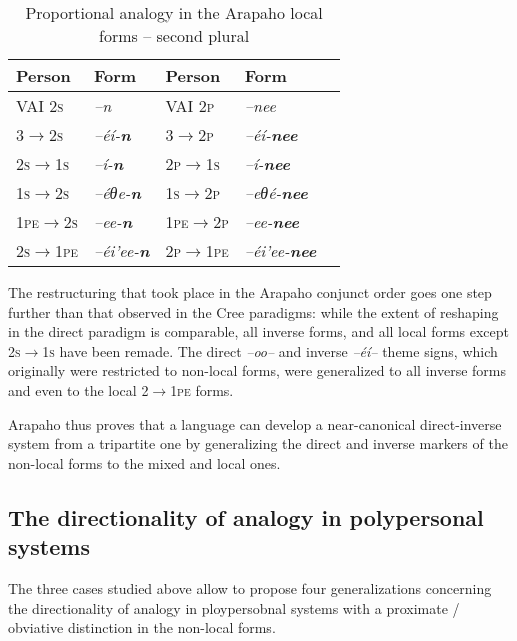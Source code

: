 \documentclass[twoside,a4paper,11pt]{article}
\newcommand{\ipa}[1]{{\phon\textit{#1}}}
\newcommand{\grise}[1]{\cellcolor{lightgray}\textbf{#1}}
\newcommand{\Σ}{\greek{Σ}}
\begin{document}
 
 \begin{table}[H]
\caption{Proportional analogy in the Arapaho local forms -- second plural}
\centering \label{tab:arapaho.analogy.local2}
\begin{tabular}{lllll}
\toprule
 Person &  Form &  Person &  Form\\
\midrule 
 VAI \textsc{2s} & \ipa{--n} &  VAI \textsc{2p} & \ipa{--nee} \\
  \textsc{3$\rightarrow$2s} & \ipa{--éí-\textbf{n}} &   \textsc{3$\rightarrow$2p} & \ipa{--éí-\textbf{nee}} \\
\textsc{2s$\rightarrow$1s}&  \ipa{--í-\textbf{n}} & \textsc{2p$\rightarrow$1s}&  \ipa{--í-\textbf{nee}} \\
   \midrule 
    \textsc{1s$\rightarrow$2s}& \ipa{--éθe-\textbf{n}} & \textsc{1s$\rightarrow$2p}&\ipa{--eθé-\textbf{nee}} \grise{} \\
    \textsc{1pe$\rightarrow$2s}&\ipa{--ee-\textbf{n}} & \textsc{1pe$\rightarrow$2p}&\ipa{--ee-\textbf{nee}}\grise{} \\
    \textsc{2s$\rightarrow$1pe}& \ipa{--éi'ee-\textbf{n}}&\textsc{2p$\rightarrow$1pe}&\ipa{--éi'ee-\textbf{nee}}\grise{}\\
\bottomrule
\end{tabular}
\end{table}
 
The restructuring that took place in the Arapaho conjunct order goes one step further than that observed in the Cree paradigms: while the extent of reshaping in the direct paradigm is comparable, all inverse forms, and   all local forms except \textsc{2s$\rightarrow$1s} have been remade. The direct \ipa{--oo--} and inverse \ipa{--éí--} theme signs, which originally were restricted to non-local forms, were generalized to all inverse forms and even to the local \textsc{2$\rightarrow$1pe} forms.

Arapaho thus proves that a language can develop a near-canonical direct-inverse system from a tripartite one by generalizing the direct and inverse markers of the non-local forms to the mixed and local ones. 

\subsection{The directionality of analogy in polypersonal systems}

The three cases studied above allow to propose four generalizations concerning the directionality of analogy in ploypersobnal systems with a proximate / obviative distinction in the non-local forms. 
 
\end{document}
